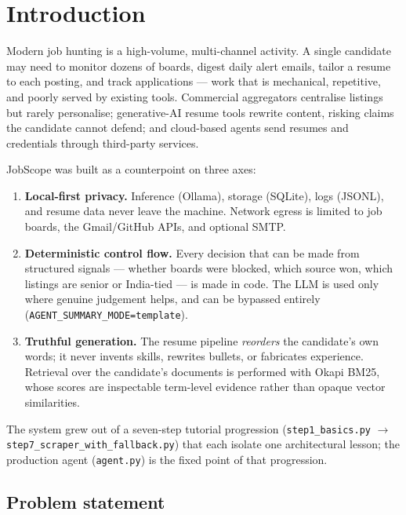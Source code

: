 \documentclass[11pt,a4paper]{article}
\newcommand{\file}[1]{\texttt{\small #1}}
\newcommand{\code}[1]{\texttt{#1}}
\begin{document}
\tableofcontents
\clearpage

\section{Introduction}
\label{sec:intro}

Modern job hunting is a high-volume, multi-channel activity. A single
candidate may need to monitor dozens of boards, digest daily alert emails,
tailor a resume to each posting, and track applications --- work that is
mechanical, repetitive, and poorly served by existing tools. Commercial
aggregators centralise listings but rarely personalise; generative-AI resume
tools rewrite content, risking claims the candidate cannot defend; and
cloud-based agents send resumes and credentials through third-party services.

JobScope was built as a counterpoint on three axes:

\begin{enumerate}[leftmargin=2em]
  \item \textbf{Local-first privacy.} Inference (Ollama), storage (SQLite),
        logs (JSONL), and resume data never leave the machine. Network egress
        is limited to job boards, the Gmail/GitHub APIs, and optional SMTP.
  \item \textbf{Deterministic control flow.} Every decision that can be made
        from structured signals --- whether boards were blocked, which source
        won, which listings are senior or India-tied --- is made in code.
        The LLM is used only where genuine judgement helps, and can be
        bypassed entirely (\code{AGENT\_SUMMARY\_MODE=template}).
  \item \textbf{Truthful generation.} The resume pipeline \emph{reorders}
        the candidate's own words; it never invents skills, rewrites bullets,
        or fabricates experience. Retrieval over the candidate's documents is
        performed with Okapi BM25, whose scores are inspectable term-level
        evidence rather than opaque vector similarities.
\end{enumerate}

The system grew out of a seven-step tutorial progression
(\file{step1\_basics.py} $\rightarrow$ \file{step7\_scraper\_with\_fallback.py})
that each isolate one architectural lesson; the production agent
(\file{agent.py}) is the fixed point of that progression.

\subsection{Problem statement}
\label{sec:problem}
\end{document}
